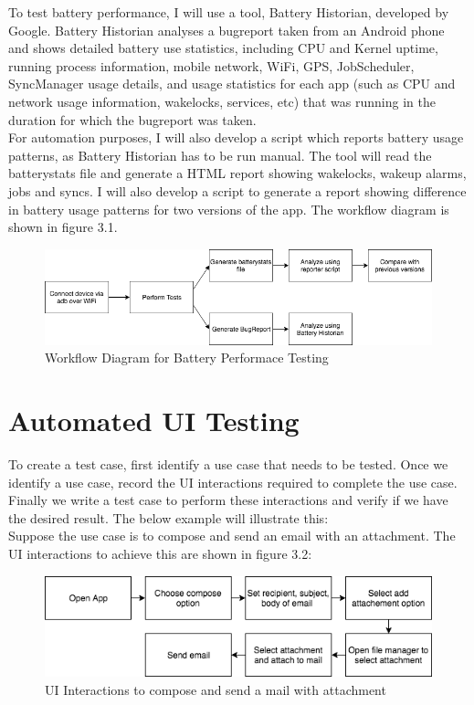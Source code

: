 To test battery performance, I will use a tool, Battery Historian, developed by Google. Battery Historian analyses a bugreport taken from an Android phone and shows detailed battery use statistics, including CPU and Kernel uptime, running process information, mobile network, WiFi, GPS, JobScheduler, SyncManager usage details, and usage statistics for each app (such as CPU and network usage information, wakelocks, services, etc) that was running in the duration for which the bugreport was taken.\cite{batteryhistorian} \\

For automation purposes, I will also develop a script which reports battery usage patterns, as Battery Historian has to be run manual. The tool will read the batterystats file and generate a HTML report showing wakelocks, wakeup alarms, jobs and syncs. I will also develop a script to generate a report showing difference in battery usage patterns for two versions of the app. The workflow diagram is shown in figure 3.1.

\begin{figure}[!h]
 	\begin{center}
		\includegraphics[scale=0.6]{Workflow}
		\caption{Workflow Diagram for Battery Performace Testing}
	\end{center}
\end{figure}

\section{Automated UI Testing}

To create a test case, first identify a use case that needs to be tested. Once we identify a use case, record the UI interactions required to complete the use case. Finally we write a test case to perform these interactions and verify if we have the desired result. The below example will illustrate this:\\

Suppose the use case is to compose and send an email with an attachment. The UI interactions to achieve this are shown in figure 3.2:
\vspace{0.5cm}
\begin{figure}[!h]
 	\begin{center}
		\includegraphics[scale=0.7]{uiflow}
		\caption{UI Interactions to compose and send a mail with attachment}
	\end{center}
\end{figure}


